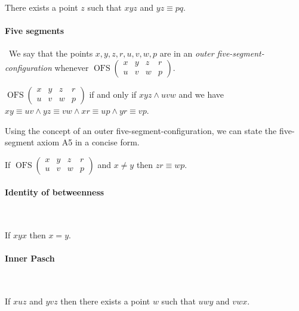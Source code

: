 \documentclass{article}
\newcommand{\Cong}[4]{#1 #2 \equiv #3 #4}
\newcommand{\Betw}[3]{#1 #2 #3}
\newcommand{\OFS}[8]{\operatorname{OFS}
\left(\begin{smallmatrix}%
#1 & #2 & #3 & #4 \\
#5 & #6 & #7 & #8
\end{smallmatrix}\right)%
}
\begin{document}
  \begin{forthel}
    \begin{axiom}[A4]
      There exists a point $z$ such that $\Betw{x}{y}{z}$ and $\Cong{y}{z}{p}{q}$.
    \end{axiom}
  \end{forthel}


  \paragraph{Five segments}\
  We say that the points $x,y,z,r,u,v,w,p$ are in an \textit{outer five-segment-configuration}
  whenever $\OFS{x}{y}{z}{r}{u}{v}{w}{p}$.

  \begin{forthel}
    \begin{definition}
      $\OFS{x}{y}{z}{r}{u}{v}{w}{p}$ if and only if
      $\Betw{x}{y}{z}
        \wedge \Betw{u}{v}{w}$
      and we have
      $\Cong{x}{y}{u}{v}
        \wedge \Cong{y}{z}{v}{w}
        \wedge \Cong{x}{r}{u}{p}
        \wedge \Cong{y}{r}{v}{p}$.
    \end{definition}
  \end{forthel}

  Using the concept of an outer five-segment-configuration,
  we can state the five-segment axiom A5 in a concise form.

  \begin{forthel}
    \begin{axiom}[A5]
      If $\OFS{x}{y}{z}{r}{u}{v}{w}{p}$ and $x \neq y$ then $\Cong{z}{r}{w}{p}$.
    \end{axiom}
  \end{forthel}


  \paragraph{Identity of betweenness}\

  \begin{forthel}
    \begin{axiom}[A6]
      If $\Betw{x}{y}{x}$ then $x = y$.
    \end{axiom}
  \end{forthel}


  \paragraph{Inner Pasch}\

  \begin{forthel}
    \begin{axiom}[A7]
      If $\Betw{x}{u}{z}$ and $\Betw{y}{v}{z}$ then there exists a point $w$
      such that $\Betw{u}{w}{y}$ and $\Betw{v}{w}{x}$.
    \end{axiom}
  \end{forthel}
\end{document}

